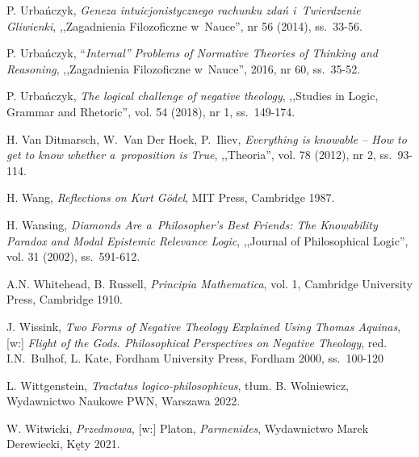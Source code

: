\begin{thebibliography}{100}
P. Urbańczyk, \textit{Geneza intuicjonistycznego rachunku zdań i~Twierdzenie Gliwienki}, ,,Zagadnienia Filozoficzne w~Nauce'', nr 56 (2014), ss.~33-56.

P. Urbańczyk, ``\textit{Internal'' Problems of Normative Theories of Thinking and Reasoning}, ,,Zagadnienia Filozoficzne w~Nauce'', 2016, nr 60, ss.~35-52.

P. Urbańczyk, \textit{The logical challenge of negative theology}, ,,Studies in Logic, Grammar and Rhetoric'', vol. 54 (2018), nr 1, ss.~149-174.


H. Van Ditmarsch, W.~Van Der Hoek, P.~Iliev, \textit{Everything is knowable -- How to get to know whether a~proposition is True}, ,,Theoria'', vol. 78 (2012), nr 2, ss.~93-114.

H. Wang, \textit{Reflections on Kurt Gödel}, MIT Press, Cambridge 1987.



H. Wansing, \textit{Diamonds Are a~Philosopher's Best Friends: The Knowability Paradox and Modal Epistemic Relevance Logic}, ,,Journal of Philosophical Logic'', vol. 31 (2002), ss.~591-612.

A.N. Whitehead, B. Russell, \textit{Principia Mathematica}, vol. 1, Cambridge University Press, Cambridge 1910.

J. Wissink, \textit{Two Forms of Negative Theology Explained Using Thomas Aquinas}, [w:]
 \textit{Flight of the Gods. Philosophical Perspectives on Negative Theology}, red. I.N.~Bulhof, L. Kate, Fordham University Press, Fordham 2000, ss.~100-120

L. Wittgenstein, \textit{Tractatus logico-philosophicus}, tłum. B. Wolniewicz, Wydawnictwo Naukowe PWN, Warszawa 2022.

W. Witwicki, \textit{Przedmowa}, [w:] Platon, \textit{Parmenides}, Wydawnictwo Marek Derewiecki, Kęty 2021.


\end{thebibliography}
